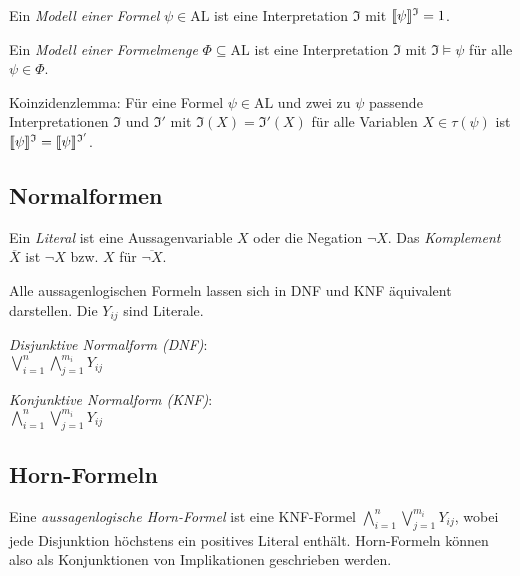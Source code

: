 \documentclass[a4paper,parskip=half*,DIV=15,fontsize=11pt]{scrartcl}
\newcommand{\AL}{\mathrm{AL}}
\DeclarePairedDelimiter\interpret{\llbracket}{\rrbracket}
\newcommand{\J}{\mathfrak{I}}
\begin{document}
Ein \emph{Modell einer Formel} $\psi \in \AL$ ist eine Interpretation $\J$ mit $\interpret{\psi}^\J = 1$.

Ein \emph{Modell einer Formelmenge} $\Phi \subseteq \AL$ ist eine Interpretation $\J$ mit $\J \models \psi$ für alle $\psi \in \Phi$.

Koinzidenzlemma: Für eine Formel $\psi \in \AL$ und zwei zu $\psi$ passende Interpretationen $\J$ und $\J'$ mit $\J(X) = \J'(X)$ für alle Variablen $X \in \tau(\psi)$ ist $\interpret{\psi}^\J = \interpret{\psi}^{\J'}$.

\subsection{Normalformen}

Ein \emph{Literal} ist eine Aussagenvariable $X$ oder die Negation $\neg X$. Das \emph{Komplement} $\overline{X}$ ist $\neg X$ bzw. $X$ für $\overline{\neg X}$.

Alle aussagenlogischen Formeln lassen sich in DNF und KNF äquivalent darstellen. Die $Y_{ij}$ sind Literale.

\begin{minipage}[t]{0.5\textwidth}
\begin{center}
\emph{Disjunktive Normalform (DNF)}: \\
$\bigvee_{i=1}^n \bigwedge_{j=1}^{m_i} Y_{ij}$
\end{center}
\end{minipage}
\begin{minipage}[t]{0.5\textwidth}
\begin{center}
\emph{Konjunktive Normalform (KNF)}: \\
$\bigwedge_{i=1}^n \bigvee_{j=1}^{m_i} Y_{ij}$
\end{center}
\end{minipage}

\subsection{Horn-Formeln}

Eine \emph{aussagenlogische Horn-Formel} ist eine KNF-Formel $\bigwedge_{i=1}^n \bigvee_{j=1}^{m_i} Y_{ij}$, wobei jede Disjunktion höchstens ein positives Literal enthält. Horn-Formeln können also als Konjunktionen von Implikationen geschrieben werden.
\end{document}
